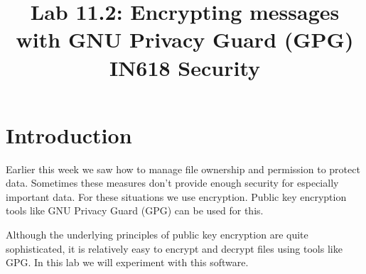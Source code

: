 \documentclass{article}
\begin{document}
\title{ Lab 11.2: Encrypting messages with GNU Privacy Guard (GPG) \\ IN618 Security}
\maketitle

\section*{Introduction}
Earlier this week we saw how to manage file ownership and permission to protect data.  Sometimes these measures don't provide enough security for especially important data.  For these situations we use encryption.  Public key encryption tools like GNU Privacy Guard (GPG) can be used for this.

Although the underlying principles of public key encryption are quite sophisticated, it is relatively easy to encrypt and decrypt files using tools like GPG. In this lab we will experiment with this software.
\end{document}
